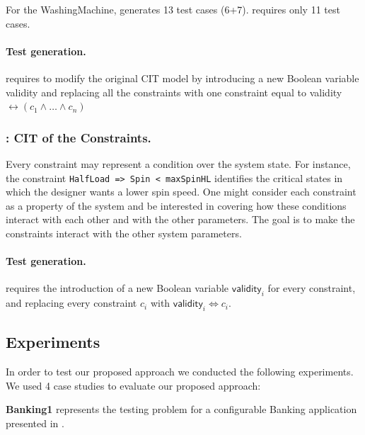 \begin{tikzborder}{\cite{Gargantini16:validation}}
	\begin{example}
		For the WashingMachine, \cucv generates 13 test cases (6+7). \ValC requires only 11 test cases.
	\end{example}
	\paragraph*{Test generation.}
	\ValC requires to modify the original CIT model by introducing a new Boolean variable \textsf{validity} and replacing all the constraints with one constraint equal to \textsf{validity} $\leftrightarrow (c_{1}\wedge \dots\wedge c_{n})$
	
	
	\subsubsection{\CCi: CIT of the Constraints.}
	Every constraint may represent a condition over the system state. For instance, the constraint
	\lstinline[language=comb]|HalfLoad => Spin < maxSpinHL|
	identifies the critical states in which the designer wants a lower spin speed. One might consider each constraint as a property of the system and be interested in covering how these conditions interact with each other and with the other parameters. The goal is to make the constraints interact with the other system parameters.
	\paragraph*{Test generation.}
	\CCi requires the introduction of a new Boolean variable $\mathsf{validity}_i$ for every constraint, and replacing every constraint $c_i$ with $\mathsf{validity}_i \Leftrightarrow c_{i}$.
	\be
	
	\subsection{Experiments}
	\label{sec:validation_experiments}
	
	\bb In order to test our proposed approach we conducted the following experiments.
	We used 4 case studies to evaluate our proposed approach:
	
	\begin{asparaenum}
		
		\item \textbf{Banking1} represents the testing problem for a configurable Banking application presented in \cite{segall_using_2011}. 
		

\end{asparaenum}
\end{tikzborder}
